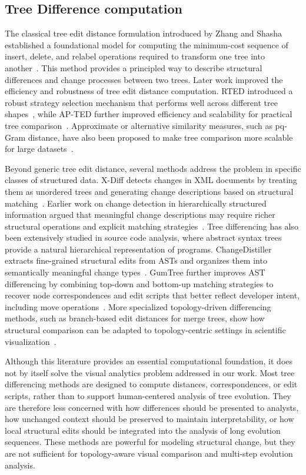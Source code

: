 \subsection{Tree Difference computation}

The classical tree edit distance formulation introduced by Zhang and Shasha established a foundational model for computing the minimum-cost sequence of insert, delete, and relabel operations required to transform one tree into another~\cite{Zhang1989TreeEditDistance}. This method provides a principled way to describe structural differences and change processes between two trees. Later work improved the efficiency and robustness of tree edit distance computation. RTED introduced a robust strategy selection mechanism that performs well across different tree shapes~\cite{Pawlik2011RTED}, while AP-TED further improved efficiency and scalability for practical tree comparison~\cite{Pawlik2015APTED}. Approximate or alternative similarity measures, such as pq-Gram distance, have also been proposed to make tree comparison more scalable for large datasets~\cite{Augsten2010PQGram}.

Beyond generic tree edit distance, several methods address the problem in specific classes of structured data. X-Diff detects changes in XML documents by treating them as unordered trees and generating change descriptions based on structural matching~\cite{Wang2003XDiff}. Earlier work on change detection in hierarchically structured information argued that meaningful change descriptions may require richer structural operations and explicit matching strategies~\cite{Chawathe1996ChangeDetection}. Tree differencing has also been extensively studied in source code analysis, where abstract syntax trees provide a natural hierarchical representation of programs. ChangeDistiller extracts fine-grained structural edits from ASTs and organizes them into semantically meaningful change types~\cite{Fluri2007ChangeDistiller}. GumTree further improves AST differencing by combining top-down and bottom-up matching strategies to recover node correspondences and edit scripts that better reflect developer intent, including move operations~\cite{Falleri2014GumTree}. More specialized topology-driven differencing methods, such as branch-based edit distances for merge trees, show how structural comparison can be adapted to topology-centric settings in scientific visualization~\cite{Bauer2022MergeTreeEditDistance}.

Although this literature provides an essential computational foundation, it does not by itself solve the visual analytics problem addressed in our work. Most tree differencing methods are designed to compute distances, correspondences, or edit scripts, rather than to support human-centered analysis of tree evolution. They are therefore less concerned with how differences should be presented to analysts, how unchanged context should be preserved to maintain interpretability, or how local structural edits should be integrated into the analysis of long evolution sequences. These methods are powerful for modeling structural change, but they are not sufficient for topology-aware visual comparison and multi-step evolution analysis.

